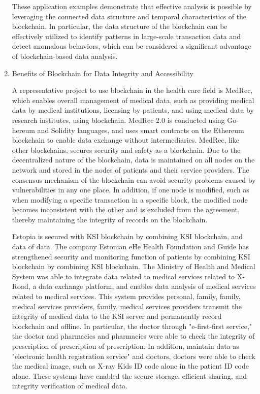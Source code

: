 \documentclass[conference]{IEEEtran}
\begin{document}
\begin{enumerate}[itemsep=2ex, parsep=1ex]
	      
	      These application examples demonstrate that effective analysis is possible by leveraging the connected data structure and temporal characteristics of the blockchain. In particular, the data structure of the blockchain can be effectively utilized to identify patterns in large-scale transaction data and detect anomalous behaviors, which can be considered a significant advantage of blockchain-based data analysis.
	              
	      
	\item Benefits of Blockchain for Data Integrity and Accessibility
	      	      
	      	       
	      A representative project to use blockchain in the health care field is MedRec, which enables overall management of medical data, such as providing medical data by medical institutions, licensing by patients, and using medical data by research institutes, using blockchain. MedRec 2.0 is conducted using Go-hereum and Solidity languages, and uses smart contracts on the Ethereum blockchain to enable data exchange without intermediaries. MedRec, like other blockchains, secures security and safety as a blockchain. Due to the decentralized nature of the blockchain, data is maintained on all nodes on the network and stored in the nodes of patients and their service providers. The consensus mechanism of the blockchain can avoid security problems caused by vulnerabilities in any one place. In addition, if one node is modified, such as when modifying a specific transaction in a specific block, the modified node becomes inconsistent with the other and is excluded from the agreement, thereby maintaining the integrity of records on the blockchain.
	      
	      Estopia is secured with KSI blockchain by combining KSI blockchain, and data of data. The company Estonian eHe Health Foundation and Guide has strengthened security and monitoring function of patients by combining KSI blockchain by combining KSI blockchain. The Ministry of Health and Medical System was able to integrate data related to medical services related to X-Road, a data exchange platform, and enables data analysis of medical services related to medical services. This system provides personal, family, family, medical services providers, family, medical services providers transmit the integrity of medical data to the KSI server and permanently record blockchain and offline. In particular, the doctor through "e-first-first service," the doctor and pharmacies and pharmacies were able to check the integrity of prescription of prescription of prescription. In addition, maintain data as "electronic health registration service" and doctors, doctors were able to check the medical image, such as X-ray Kids ID code alone in the patient ID code alone. These systems have enabled the secure storage, efficient sharing, and integrity verification of medical data.
	              

\end{enumerate}
\end{document}

